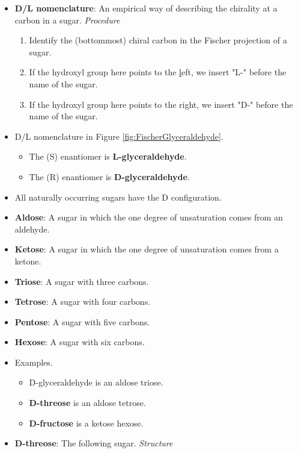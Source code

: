 \documentclass[../notes.tex]{subfiles}
\begin{document}
\begin{itemize}
    \item \textbf{D/L nomenclature}: An empirical way of describing the chirality at a carbon in a sugar. \emph{Procedure}
    \begin{enumerate}
        \item Identify the (bottommost) chiral carbon in the Fischer projection of a sugar.
        \item If the hydroxyl group here points to the \underline{l}eft, we insert "L-" before the name of the sugar.
        \item If the hydroxyl group here points to the right, we insert "D-" before the name of the sugar.
    \end{enumerate}
    \item D/L nomenclature in Figure \ref{fig:FischerGlyceraldehyde}.
    \begin{itemize}
        \item The (S) enantiomer is \textbf{L-glyceraldehyde}.
        \item The (R) enantiomer is \textbf{D-glyceraldehyde}.
    \end{itemize}
    \item All naturally occurring sugars have the D configuration.
    \item \textbf{Aldose}: A sugar in which the one degree of unsaturation comes from an aldehyde.
    \item \textbf{Ketose}: A sugar in which the one degree of unsaturation comes from a ketone.
    \item \textbf{Triose}: A sugar with three carbons.
    \item \textbf{Tetrose}: A sugar with four carbons.
    \item \textbf{Pentose}: A sugar with five carbons.
    \item \textbf{Hexose}: A sugar with six carbons.
    \item Examples.
    \begin{itemize}
        \item D-glyceraldehyde is an aldose triose.
        \item \textbf{D-threose} is an aldose tetrose.
        \item \textbf{D-fructose} is a ketose hexose.
    \end{itemize}
    \item \textbf{D-threose}: The following sugar. \emph{Structure}
    \begin{figure}[h!]
        \centering
        \footnotesize

\end{figure}
\end{itemize}
\end{document}
